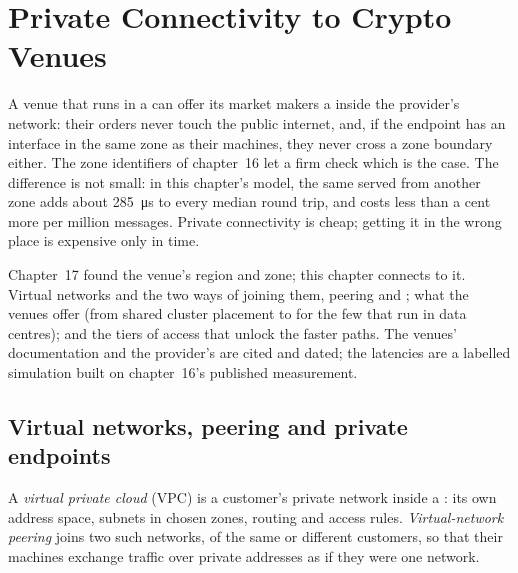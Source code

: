 \chapter{Private Connectivity to Crypto Venues}\label{ch:nw:private-connectivity-to-crypto-venues}

A venue that runs in a  can offer its market makers a  inside the provider's network: their orders never touch
the public internet, and, if the endpoint has an interface in the same zone as their machines, they never cross a zone boundary either. The
zone identifiers of chapter~16 let a firm check which is the case. The difference is not small: in this chapter's model, the same  served from another zone adds about \qty{285}{\micro\second} to every median round trip, and costs less than a cent more per million
messages. Private connectivity is cheap; getting it in the wrong place is expensive only in time.

Chapter~17 found the venue's region and zone; this chapter connects to it. Virtual networks and the two ways of joining them, peering and
; what the venues offer (from shared cluster placement to   for the few that run in data centres);
and the tiers of access that unlock the faster paths. The venues' documentation and the provider's are cited and dated; the latencies are a
labelled simulation built on chapter~16's published measurement.

\section{Virtual networks, peering and private endpoints}

\begin{definition}\label{def:nw:private-connectivity-to-crypto-venues:peering}
A \emph{virtual private cloud} (VPC) is a customer's private network inside a : its own address space,
subnets in chosen zones, routing and access rules. \emph{Virtual-network peering} joins two such networks, of the
same or different customers, so that their machines exchange traffic over private addresses as if they were one network.
\end{definition}

